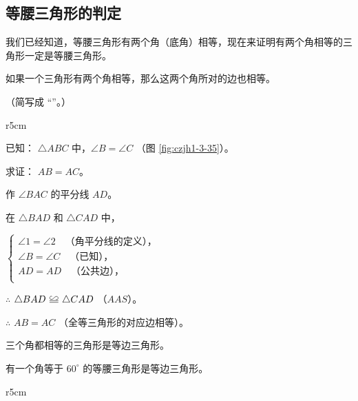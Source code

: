 \subsection{等腰三角形的判定}\label{subsec:czjh1-3-9}

我们已经知道，等腰三角形有两个角（底角）相等，现在来证明有两个角相等的三角形一定是等腰三角形。

\begin{dingli}[等腰三角形的判定定理]
    如果一个三角形有两个角相等，那么这两个角所对的边也相等。
\end{dingli} （简写成 “”。）

\begin{wrapfigure}[8]{r}{5cm}
    \centering
    
    \caption{}\label{fig:czjh1-3-35}
\end{wrapfigure}

已知： $\triangle ABC$ 中，$\angle B = \angle C$ （图 \ref{fig:czjh1-3-35}）。

求证： $AB = AC$。

\zhengming 作 $\angle BAC$ 的平分线 $AD$。

在 $\triangle BAD$ 和 $\triangle CAD$ 中，

\hspace{2em} $\begin{cases}
    \angle 1 = \angle 2 \quad \text{（角平分线的定义），} \\
    \angle B = \angle C \quad \text{（已知），} \\
    AD = AD \quad \text{（公共边），} \\
\end{cases}$

$\therefore$ \quad $\triangle BAD \quandeng \triangle CAD$ （$AAS$）。

$\therefore$ \quad $AB = AC$ （全等三角形的对应边相等）。

\begin{tuilun}[推论 1]
    三个角都相等的三角形是等边三角形。
\end{tuilun}

\begin{tuilun}[推论 2]
    有一个角等于 $60^\circ$ 的等腰三角形是等边三角形。
\end{tuilun}


\begin{wrapfigure}[8]{r}{5cm}
    \centering
    
    \caption{}\label{fig:czjh1-3-36}
\end{wrapfigure}


